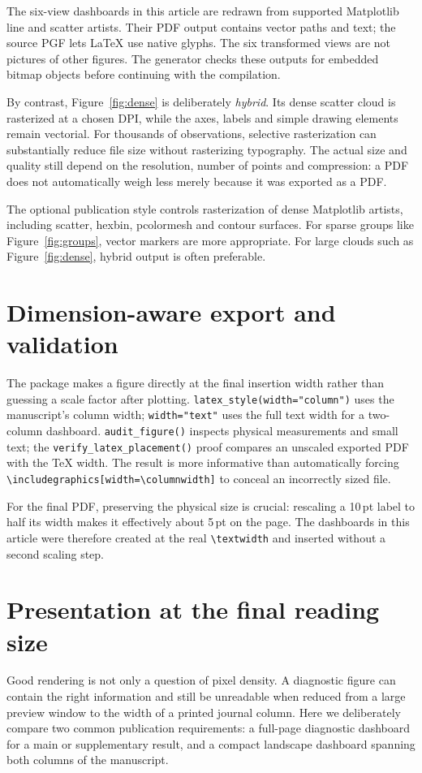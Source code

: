\documentclass[10pt,twocolumn,a4paper]{article}
\begin{document}
The six-view dashboards in this article are
redrawn from supported Matplotlib line and scatter
artists. Their PDF output contains vector paths
and text; the source PGF lets LaTeX use native
glyphs. The six transformed views are not
pictures of other figures. The generator checks
these outputs for embedded bitmap objects before
continuing with the compilation.

By contrast, Figure~\ref{fig:dense} is deliberately
\emph{hybrid}. Its dense scatter cloud is
rasterized at a chosen DPI, while the axes,
labels and simple drawing elements remain
vectorial. For thousands of observations,
selective rasterization can substantially reduce
file size without rasterizing typography. The
actual size and quality still depend on the
resolution, number of points and compression:
a PDF does not automatically weigh less merely
because it was exported as a PDF.

The optional publication style controls
rasterization of dense Matplotlib artists,
including scatter, hexbin, pcolormesh and
contour surfaces. For sparse groups like
Figure~\ref{fig:groups}, vector markers are
more appropriate. For large clouds such as
Figure~\ref{fig:dense}, hybrid output is
often preferable.

\section{Dimension-aware export and validation}
The package makes a figure directly at
the final insertion width rather than
guessing a scale factor after plotting.
\texttt{latex\_style(width="column")}
uses the manuscript's column width;
\texttt{width="text"} uses the full text
width for a two-column dashboard.
\texttt{audit\_figure()} inspects physical
measurements and small text; the
\texttt{verify\_latex\_placement()} proof
compares an unscaled exported PDF with the
TeX width. The result is more informative
than automatically forcing
\verb|\includegraphics[width=\columnwidth]|
to conceal an incorrectly sized file.

For the final PDF, preserving the physical
size is crucial: rescaling a 10\,pt label to
half its width makes it effectively about
5\,pt on the page. The dashboards in this
article were therefore created at the real
\verb|\textwidth| and inserted without
a second scaling step.

\section{Presentation at the final reading size}
Good rendering is not only a question of pixel density. A diagnostic figure
can contain the right information and still be unreadable when reduced from
a large preview window to the width of a printed journal column.
Here we deliberately compare two common publication requirements: a
full-page diagnostic dashboard for a main or supplementary result, and a
compact landscape dashboard spanning both columns of the manuscript.
\end{document}
